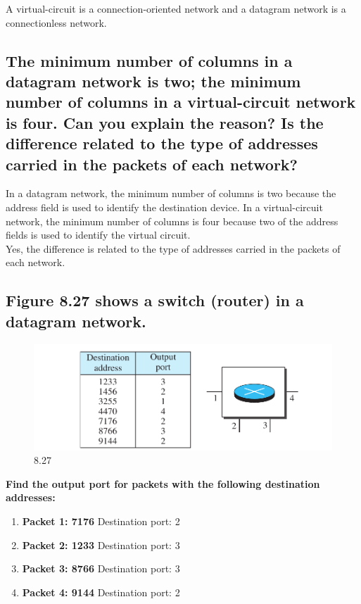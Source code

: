 \documentclass{article}
\begin{document}
\begin{theorem}
	A virtual-circuit is a connection-oriented network and a datagram network is a
	connectionless network.
\end{theorem}

\subsection{The minimum number of columns in a datagram network is two; the minimum
	number of columns in a virtual-circuit network is four. Can you explain the
	reason? Is the difference related to the type of addresses carried in the packets
	of each network?}

In a datagram network, the minimum number of columns is two because the address field is used to identify the destination device.
In a virtual-circuit network, the minimum number of columns is four because two of the address fields is used to identify the virtual circuit. \\
Yes, the difference is related to the type of addresses carried in the packets of each network.

\subsection{Figure 8.27 shows a switch (router) in a datagram network.}

\begin{figure}[H]
	\center
	\includegraphics[scale=0.5]{8.27.png}
	\caption{8.27}
\end{figure}
\textbf{Find the output port for packets with the following destination addresses:}
\begin{enumerate}
	\item \textbf{ Packet 1: 7176 } Destination port: 2
	\item \textbf{ Packet 2: 1233 } Destination port: 3
	\item \textbf{ Packet 3: 8766 } Destination port: 3
	\item \textbf{ Packet 4: 9144 } Destination port: 2
\end{enumerate}
\end{document}
